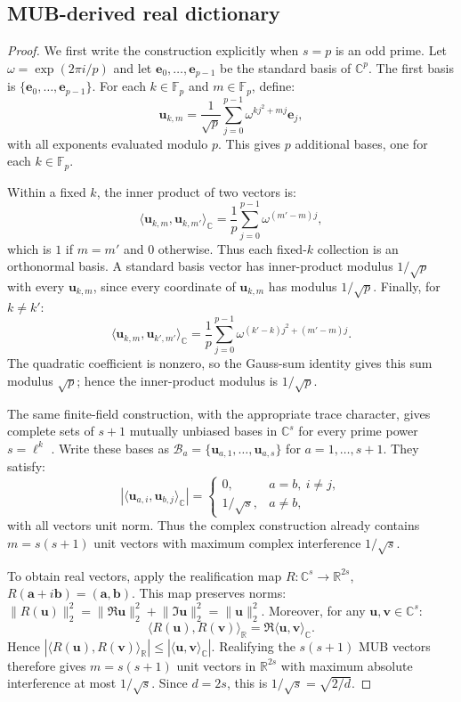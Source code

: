\documentclass{article}
\newcommand{\1}{\bm{1}}
\newcommand{\norm}[1]{\lVert {#1} \rVert}
\newcommand{\lrangle}[1]{\langle#1\rangle}
\def\va{{\bm{a}}}
\def\vb{{\bm{b}}}
\def\ve{{\bm{e}}}
\def\vu{{\bm{u}}}
\def\vv{{\bm{v}}}
\newcommand{\R}{\mathbb{R}}
\theoremstyle{definition}
\begin{document}
\subsection{MUB-derived real dictionary}
\label{app:mub_construct}

\mubconstruct*
\begin{proof}
  We first write the construction explicitly when $s=p$ is an odd prime. Let
  $\omega=\exp(2\pi i/p)$ and let $\ve_0,\dots,\ve_{p-1}$ be the standard basis of
  $\mathbb{C}^p$. The first basis is $\{\ve_0,\dots,\ve_{p-1}\}$. For each
  $k\in\mathbb{F}_p$ and $m\in\mathbb{F}_p$, define:
  \[
    \vu_{k,m}
    =
    \frac{1}{\sqrt p}\sum_{j=0}^{p-1}\omega^{k j^2+mj}\ve_j,
  \]
  with all exponents evaluated modulo $p$. This gives $p$ additional bases, one for each
  $k\in\mathbb{F}_p$.

  Within a fixed $k$, the inner product of two vectors is:
  \[
    \lrangle{\vu_{k,m},\vu_{k,m'}}_{\mathbb{C}}
    =
    \frac1p\sum_{j=0}^{p-1}\omega^{(m'-m)j},
  \]
  which is $1$ if $m=m'$ and $0$ otherwise. Thus each fixed-$k$ collection is an orthonormal basis. A
  standard basis vector has inner-product modulus $1/\sqrt p$ with every $\vu_{k,m}$, since every
  coordinate of $\vu_{k,m}$ has modulus $1/\sqrt p$. Finally, for $k\ne k'$:
  \[
    \lrangle{\vu_{k,m},\vu_{k',m'}}_{\mathbb{C}}
    =
    \frac1p\sum_{j=0}^{p-1}
    \omega^{(k'-k)j^2+(m'-m)j}.
  \]
  The quadratic coefficient is nonzero, so the Gauss-sum identity gives this sum modulus $\sqrt p$;
  hence the inner-product modulus is $1/\sqrt p$.

  The same finite-field construction, with the appropriate trace character, gives complete sets of
  $s+1$ mutually unbiased bases in $\mathbb{C}^s$ for every prime power $s=\ell^k$
  \citep{wootters89optimal,bandyopadhyay02new}. Write these bases as
  $\mathcal{B}_a=\{\vu_{a,1},\dots,\vu_{a,s}\}$ for $a=1,\dots,s+1$. They satisfy:
  \[
    \left|\lrangle{\vu_{a,i},\vu_{b,j}}_{\mathbb{C}}\right|
    =
    \begin{cases}
      0,          & a=b,\ i\ne j, \\
      1/\sqrt{s}, & a\ne b,
    \end{cases}
  \]
  with all vectors unit norm. Thus the complex construction already contains $m=s(s+1)$ unit vectors
  with maximum complex interference $1/\sqrt{s}$.

  To obtain real vectors, apply the realification map $R:\mathbb{C}^s\to\R^{2s}$,
  $R(\va+i\vb)=(\va,\vb)$. This map preserves norms:
  $\norm{R(\vu)}_2^2=\norm{\Re\vu}_2^2+\norm{\Im\vu}_2^2=\norm{\vu}_2^2$. Moreover, for any
  $\vu,\vv\in\mathbb{C}^s$:
  \[
    \lrangle{R(\vu),R(\vv)}_{\mathbb{R}}
    =
    \Re\lrangle{\vu,\vv}_{\mathbb{C}} .
  \]
  Hence $\left|\lrangle{R(\vu),R(\vv)}_{\mathbb{R}}\right|\le
    \left|\lrangle{\vu,\vv}_{\mathbb{C}}\right|$. Realifying the $s(s+1)$ MUB vectors therefore gives
  $m=s(s+1)$ unit vectors in $\R^{2s}$ with maximum absolute interference at most $1/\sqrt{s}$. Since
  $d=2s$, this is $1/\sqrt{s}=\sqrt{2/d}$.
\end{proof}
\end{document}
